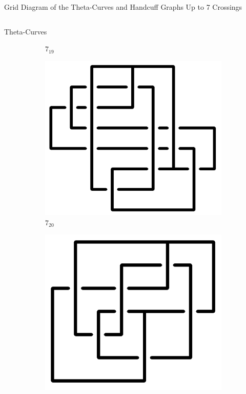 \documentclass[final]{beamer}
\begin{document}
\begin{frame}[t]
\begin{alertblock}{Grid Diagram of the Theta-Curves and Handcuff Graphs Up to 7 Crossings}
\begin{columns}[t]
\begin{column}{0.5\textwidth}
\begin{alertblock}{Theta-Curves}
\begin{figure}
\begin{subfigure}{0.075\textwidth}
    \caption{$7_{19}$} 
    \end{subfigure}
    \begin{subfigure}{0.075\textwidth}
    \includegraphics[width=\columnwidth]{../Midterm_Poster/grid_diagram/theta_7_20.png}
    \caption{$7_{20}$} 
    \end{subfigure}
    \begin{subfigure}{0.075\textwidth}
    \includegraphics[width=\columnwidth]{../Midterm_Poster/grid_diagram/theta_7_21.png}

\end{subfigure}
\end{figure}
\end{alertblock}
\end{column}
\end{columns}
\end{alertblock}
\end{frame}
\end{document}
